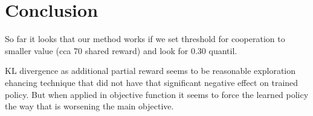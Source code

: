 \chapter*{Conclusion}
So far it looks that our method works if we set threshold for cooperation to smaller value (cca 70 shared reward) and look for 0.30 quantil.

KL divergence as additional partial reward seems to be reasonable exploration ehancing technique that did not have that significant negative effect on trained policy.
But when applied in objective function it seems to force the learned policy the way that is worsening the main objective.

